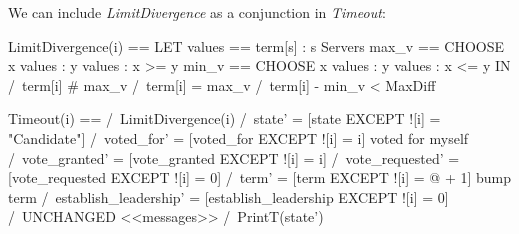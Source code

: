 We can include \textit{LimitDivergence} as a conjunction in
\textit{Timeout}:\newline
\begin{tla}
LimitDivergence(i) == 
    LET 
        values == {term[s] : s \in Servers}
        max_v == CHOOSE x \in values : \A y \in values : x >= y
        min_v == CHOOSE x \in values : \A y \in values : x <= y
    IN 
        \/ /\ term[i] # max_v
        \/ /\ term[i] = max_v 
           /\ term[i] - min_v < MaxDiff

Timeout(i) == 
    /\ LimitDivergence(i)
    /\ state' = [state EXCEPT ![i] = "Candidate"]
    /\ voted_for' = [voted_for EXCEPT ![i] = i]             \* voted for myself
    /\ vote_granted' = [vote_granted EXCEPT ![i] = {i}]
    /\ vote_requested' = [vote_requested EXCEPT ![i] = 0]
    /\ term' = [term EXCEPT ![i] = @ + 1]                   \* bump term
    /\ establish_leadership' = [establish_leadership EXCEPT ![i] = 0]
    /\ UNCHANGED <<messages>>
    \* /\ PrintT(state')
\end{tla}
\begin{tlatex}
%
%
%
%
%
%
%
\@pvspace{8.0pt}%
%
%
%
\@xx{}%
%
\@xx{}%
%
%
%
\@xx{}%
\end{tlatex}

